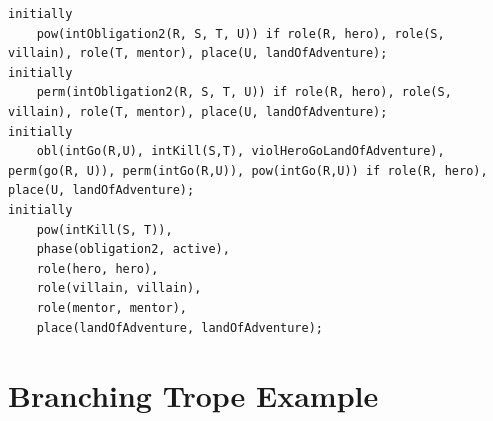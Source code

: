\documentclass[11pt]{report}
\begin{document}
\begin{lstlisting}[label={lst:obl2-instal}, caption={An institution with an
obligation event containing a deadline and a consequence}]
% INITIALLY: -----------
initially
    pow(intObligation2(R, S, T, U)) if role(R, hero), role(S, villain), role(T, mentor), place(U, landOfAdventure);
initially
    perm(intObligation2(R, S, T, U)) if role(R, hero), role(S, villain), role(T, mentor), place(U, landOfAdventure);
initially
    obl(intGo(R,U), intKill(S,T), violHeroGoLandOfAdventure), perm(go(R, U)), perm(intGo(R,U)), pow(intGo(R,U)) if role(R, hero), place(U, landOfAdventure);
initially
    pow(intKill(S, T)),
    phase(obligation2, active),
    role(hero, hero),
    role(villain, villain),
    role(mentor, mentor),
    place(landOfAdventure, landOfAdventure);
\end{lstlisting}

\section{Branching Trope Example}
\label{appendix:branch3}
\end{document}
